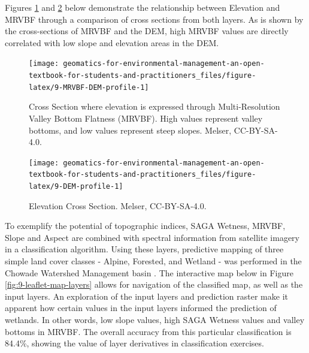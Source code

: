 \documentclass[
]{book}
\begin{document}
Figures \ref{fig:9-MRVBF-DEM-profile} and \ref{fig:9-DEM-profile} below demonstrate the relationship between Elevation and MRVBF through a comparison of cross sections from both layers. As is shown by the cross-sections of MRVBF and the DEM, high MRVBF values are directly correlated with low slope and elevation areas in the DEM.

\begin{figure}
\texttt{[image: geomatics-for-environmental-management-an-open-textbook-for-students-and-practitioners\_files/figure-latex/9-MRVBF-DEM-profile-1]} \caption{Cross Section where elevation is expressed through Multi-Resolution Valley Bottom Flatness (MRVBF). High values represent valley bottoms, and low values represent steep slopes. Melser, CC-BY-SA-4.0.}\label{fig:9-MRVBF-DEM-profile}
\end{figure}

\begin{figure}
\texttt{[image: geomatics-for-environmental-management-an-open-textbook-for-students-and-practitioners\_files/figure-latex/9-DEM-profile-1]} \caption{Elevation Cross Section. Melser, CC-BY-SA-4.0.}\label{fig:9-DEM-profile}
\end{figure}

To exemplify the potential of topographic indices, SAGA Wetness, MRVBF, Slope and Aspect are combined with spectral information from satellite imagery in a classification algorithm. Using these layers, predictive mapping of three simple land cover classes - Alpine, Forested, and Wetland - was performed in the Chowade Watershed Management basin \citep{city_of_vancouver_notitle_2009}. The interactive map below in Figure \ref{fig:9-leaflet-map-layers} allows for navigation of the classified map, as well as the input layers. An exploration of the input layers and prediction raster make it apparent how certain values in the input layers informed the prediction of wetlands. In other words, low slope values, high SAGA Wetness values and valley bottoms in MRVBF. The overall accuracy from this particular classification is 84.4\%, showing the value of layer derivatives in classification exercises.
\end{document}
